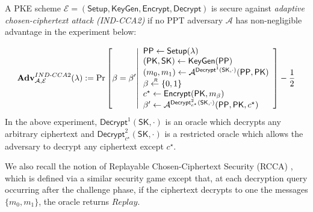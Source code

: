 \documentclass[10pt]{llncs}
\newcommand{\Adv}{\mathbf{Adv}}
\newcommand{\A}{\mathcal{A}}
\newcommand{\SK}{\mathsf{SK}}
\newcommand{\PK}{\mathsf{PK}}
\newcommand{\sample}{\stackrel{{\scriptscriptstyle \mkern4mu R}}{\gets}}
\newcommand{\Setup}{{\mathsf{Setup}}}
\newcommand{\KeyGen}{{\mathsf{KeyGen}}}
\newcommand{\Enc}{{\mathsf{Encrypt}}}
\newcommand{\Dec}{{\mathsf{Decrypt}}}
\newcommand{\PPP}{\mathsf{PP}}
\begin{document}
\begin{definition} A PKE scheme $\mathcal{E} = (\Setup, \KeyGen, \Enc, \Dec)$ is secure against \emph{adaptive chosen-ciphertext attack (IND-CCA2)} if   no PPT adversary $\A$ has non-negligible advantage in the experiment below:

  \begin{align*}
    \Adv_{\A, \mathcal{E}}^{IND\textrm{-}CCA2} (\lambda) := \Pr \left[
    \beta = \beta'
    \middle|
    \begin{array}{l}
      \PPP \gets \Setup(\lambda)\\
      (\PK, \SK) \gets \KeyGen(\PPP)\\
      (m_0, m_1) \gets \A^{\Dec^1(\SK, \cdot)}(\PPP, \PK)\\
      \beta \sample \{0,1\}\\
      c^\star \gets \Enc(\PK, m_\beta  )\\
      \beta ' \gets \A^{\Dec^2_{c^\star}(\SK, \cdot)}(\PPP, \PK, c^\star)
    \end{array}
    \right] - \frac{1}{2}
  \end{align*}
    In the above experiment, $\Dec^1(\SK, \cdot)$ is an oracle which   decrypts any arbitrary ciphertext and $\Dec^2_{c^\star }(\SK, \cdot)$ is a restricted oracle which allows the adversary to decrypt any ciphertext except $c^\star$.
   
  \end{definition}
   
  We also recall the notion of Replayable Chosen-Ciphertext Security (RCCA) \cite{DBLP:conf/crypto/CanettiKN03}, which is defined via a similar security game   except that, 
	at each decryption query occurring after the challenge phase,   if the ciphertext decrypts to one the messages $\{m_0,m_1\}$, the oracle
	returns $Replay$.
\end{document}
